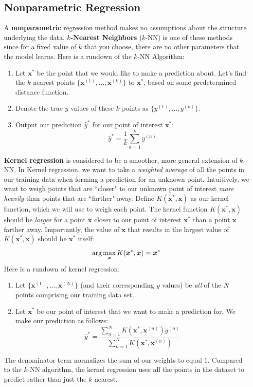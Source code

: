 \documentclass[11pt, letterpaper]{article}
\theoremstyle{definition}
\theoremstyle{plain}
\begin{document}
\subsection{Nonparametric Regression}
A \textbf{nonparametric} regression method makes no assumptions about the structure underlying the data. \textbf{$k$-Nearest Neighbors} ($k$-NN) is one of these methods since for a fixed value of $k$ that you choose, there are no other parameters that the model learns. Here is a rundown of the $k$-NN Algorithm:
    \begin{enumerate}
        \item Let $\bm{x}^*$ be the point that we would like to make a prediction about. Let's find the $k$ nearest points $\{\bm{x}^{(1)}, \ldots, \bm{x}^{(k)}\}$ to $\bm{x}^*$, based on some predetermined distance function.
        \item Denote the true $y$ values of these $k$ points as $\{y^{(1)}, \ldots, y^{(k)} \}$.
        \item Output our prediction $\hat{y}^*$ for our point of interest $\bm{x}^*$:
        \[\hat{y}^* =  \frac{1}{k}\sum_{n=1}^{k}y^{(n)}\]
    \end{enumerate}

    \textbf{Kernel regression} is considered to be a smoother, more general extension of $k$-NN. In Kernel regression, we want to take a \emph{weighted average} of all the points in our training data when forming a prediction for an unknown point. Intuitively, we want to weigh points that are ``closer" to our unknown point of interest \emph{more heavily} than points that are ``farther" away. Define $K(\bm{x}^*, \bm{x})$ as our kernel function, which we will use to weigh each point. The kernel function $K(\bm{x}^*, \bm{x})$ should be \emph{larger} for a point $\bm{x}$ closer to our point of interest $\bm{x}^*$ than a point $\bm{x}$ farther away. Importantly, the value of $\bm{x}$ that results in the largest value of $K(\bm{x}^*, \bm{x})$ should be $\bm{x}^*$ itself: 
    \[\textnormal{arg}\max_{\bm{x}} K(\bm{x}^*, \bm{x}) = \bm{x}^{*}\]
    Here is a rundown of kernel regression:
    \begin{enumerate}
        \item Let $\{\bm{x}^{(1)}, \ldots, \bm{x}^{(N)}\}$ (and their corresponding $y$ values) be \emph{all} of the $N$ points comprising our training data set. \item Let $\bm{x^{*}}$ be our point of interest that we want to make a prediction for. We make our prediction as follows:
        \[\hat{y}^* = \frac{\sum_{n=1}^{N}K(\bm{x}^*, \bm{x}^{(n)}) y^{(n)}}{\sum_{n=1}^{N}K(\bm{x}^*, \bm{x}^{(n)})}\]
    \end{enumerate}
    The denominator term normalizes the sum of our weights to equal $1$. Compared to the $k$-NN algorithm, the kernel regression uses all the points in the dataset to predict rather than just the $k$ nearest. 
\end{document}
